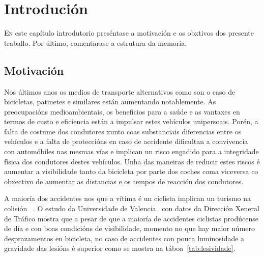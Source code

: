 \chapter{Introdución}
\label{chap:introducion}

\lettrine{E}{n} este capítulo introdutorio preséntase a motivación e os obxtivos dos presente traballo.
Por último, comentarase a estrutura da memoria.

\section{Motivación}

Nos últimos anos os medios de transporte alternativos como son o caso de bicicletas, patinetes e similares están aumentando notablemente. As preocupacións medioambientais, os beneficios para a saúde e as vantaxes en termos de custo e eficiencia están a impulsar estes vehículos unipersoais. Porén, a falta de costume dos condutores xunto coas substanciais diferencias entre os vehículos e a falta de proteccións en caso de accidente dificultan a convivencia con automóbiles nas mesmas vías e implican un risco engadido para a integridade física dos condutores destes vehículos. Unha das maneiras de reducir estes riscos é aumentar a visibilidade tanto da bicicleta por parte dos coches coma viceversa co obxectivo de aumentar as distancias e os tempos de reacción dos condutores.

A maioría dos accidentes nos que a vítima é un ciclista implican un turismo na colisión~\cite{PrincipalesCifrasSiniestralidad} .
O estudo da Universidade de Valencia~\cite{ESTUDIOANALISISSINIESTRALIDAD} con datos da Dirección Xeneral de Tráfico mostra que a pesar de que a maioría de accidentes ciclistas prodúcense de día e con boas condicións de visibilidade, momento no que hay maior número desprazamentos en bicicleta, no caso de accidentes con pouca luminosidade a gravidade das lesións é superior como se mostra na táboa~\ref{tab:lesividade}.


